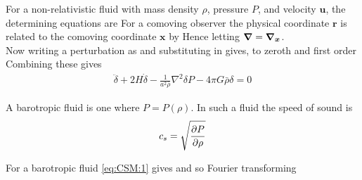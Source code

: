 \documentclass{article}
\begin{document}
For a non-relativistic fluid with mass density $\rho$, pressure $P$, and velocity $\bm{u}$, the determining equations are 
For a comoving observer the physical coordinate $\bm{r}$ is related to the comoving coordinate $\bm{x}$ by 
Hence 
letting $\grad = \grad_{\bm{x}}$. \\
Now writing a perturbation as 
and substituting in gives, to zeroth and first order 
Combining these gives 
\begin{align} \label{eq:CSM:1}
\ddot{\delta} + 2H\dot{\delta} - \frac{1}{a^2\bar{\rho}}\nabla^2 \delta P - 4\pi G \bar{\rho}\delta = 0
\end{align}

\begin{definition}
A barotropic fluid is one where $P=P(\rho)$. In such a fluid the speed of sound is 
\[
c_s = \sqrt{\pd[P]{\rho}}
\]
\end{definition}

For a barotropic fluid \ref{eq:CSM:1} gives 
and so Fourier transforming 
\end{document}
